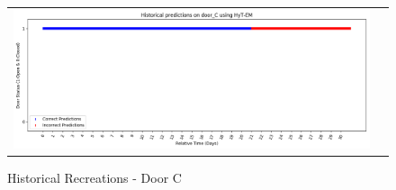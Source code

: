 \begin{center}
\begin{figure}[!Hp]
\begin{tabular}{cc}
    {\includegraphics[width = 6in]{images/results/Historical_door_C_HyT-EM.png}} \\
  \end{tabular}
  \caption{Historical Recreations - Door C}
  \label{figure:historical_door_C}
\end{figure}\\ \\


\end{center}
